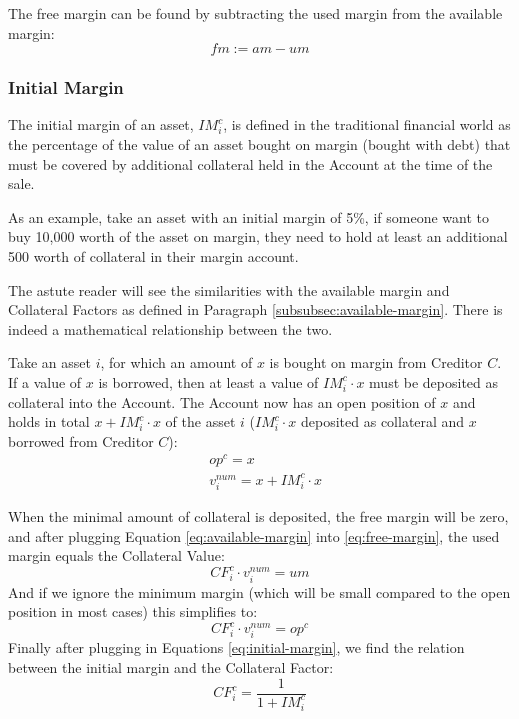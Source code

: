 \documentclass[sigconf,nonacm]{acmart}
\begin{document}
The free margin can be found by subtracting the used margin from the available margin:
\begin{equation}
    \label{eq:free-margin}
    fm := am - um
\end{equation}

\subsubsection{Initial Margin}
\label{subsubsec:initial-margin}
The initial margin of an asset, $IM_{i}^{c}$, is defined in the traditional financial world as the percentage of the value of an asset bought on margin (bought with debt)
that must be covered by additional collateral held in the Account at the time of the sale.

As an example, take an asset with an initial margin of 5\%, if someone want to buy 10,000 worth of the asset on margin,
they need to hold at least an additional 500 worth of collateral in their margin account.

The astute reader will see the similarities with the available margin and Collateral Factors as defined in Paragraph \ref{subsubsec:available-margin}.
There is indeed a mathematical relationship between the two.

Take an asset $i$, for which an amount of $x$ is bought on margin from Creditor $C$.
If a value of $x$ is borrowed, then at least a value of $IM_{i}^{c} \cdot x$ must be deposited as collateral into the Account.
The Account now has an open position of $x$ and holds in total $x + IM_{i}^{c} \cdot x$ of the asset $i$ ($IM_{i}^{c} \cdot x$ deposited as collateral and $x$ borrowed from Creditor $C$):
\begin{equation}
    \label{eq:initial-margin}
    \begin{split}
        &op^c = x\\
        &v^{num}_i = x + IM_{i}^{c} \cdot x
    \end{split}
\end{equation}

When the minimal amount of collateral is deposited, the free margin will be zero, and after plugging Equation \ref{eq:available-margin} into \ref{eq:free-margin}, the used margin equals the Collateral Value:
\begin{equation}
    CF_{i}^{c} \cdot v^{num}_i = um
\end{equation}
And if we ignore the minimum margin (which will be small compared to the open position in most cases) this simplifies to:
\begin{equation}
    CF_{i}^{c} \cdot v^{num}_i = op^c
\end{equation}
Finally after plugging in Equations \ref{eq:initial-margin}, we find the relation between the initial margin and the Collateral Factor:
\begin{equation}
    CF_{i}^{c} = \frac{1}{1 + IM_{i}^{c}}
\end{equation}
\end{document}
